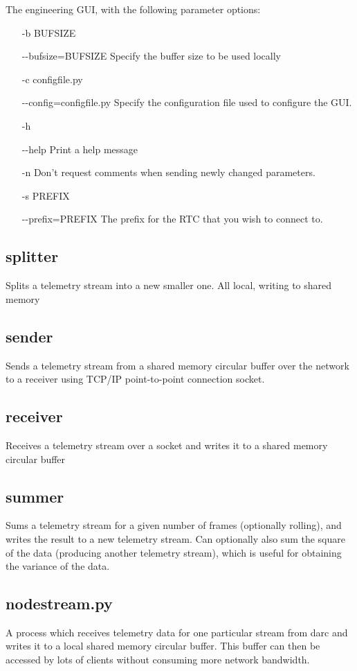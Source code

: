 \documentclass[a4,10pt]{article}
\begin{document}
The engineering GUI, with the following parameter options:
\begin{itemize}
\item[-b BUFSIZE]
\item[-{-}bufsize=BUFSIZE] Specify the buffer size to be
  used locally
\item[-c configfile.py]
\item[-{-}config=configfile.py] Specify the
  configuration file used to configure the GUI.
\item[-h]
\item[-{-}help] Print a help message
\item[-n] Don't request comments when sending newly changed
  parameters.
\item[-s PREFIX]
\item[-{-}prefix=PREFIX] The prefix for the RTC that you
  wish to connect to.
\end{itemize}

\subsection{splitter}
Splits a telemetry stream into a new smaller one.  All local, writing
to shared memory

\subsection{sender}
Sends a telemetry stream from a shared memory circular buffer over the
network to a receiver using TCP/IP point-to-point connection socket.

\subsection{receiver}
Receives a telemetry stream over a socket and writes it to a shared
memory circular buffer

\subsection{summer}
Sums a telemetry stream for a given number of frames (optionally
rolling), and writes the result to a new telemetry stream.  Can
optionally also sum the square of the data (producing another
telemetry stream), which is useful for obtaining the variance of the data.


\subsection{nodestream.py}
A process which receives telemetry data for one particular stream from
darc and writes it to a local shared memory circular buffer.  This
buffer can then be accessed by lots of clients without consuming more
network bandwidth.
\end{document}
